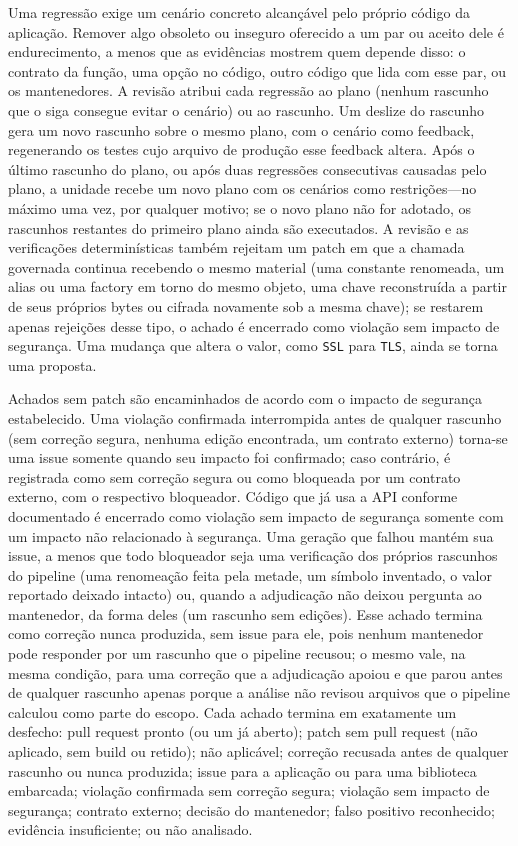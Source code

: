\documentclass[conference]{IEEEtran}
\begin{document}
Uma regressão exige um cenário concreto alcançável pelo próprio código da
aplicação. Remover algo obsoleto ou inseguro oferecido a um par ou aceito dele
é endurecimento, a menos que as evidências mostrem quem depende disso: o
contrato da função, uma opção no código, outro código que lida com esse par, ou
os mantenedores. A revisão atribui cada regressão ao plano (nenhum rascunho que
o siga consegue evitar o cenário) ou ao rascunho. Um deslize do rascunho gera
um novo rascunho sobre o mesmo plano, com o cenário como feedback, regenerando
os testes cujo arquivo de produção esse feedback altera. Após o último rascunho
do plano, ou após duas regressões consecutivas causadas pelo plano, a unidade
recebe um novo plano com os cenários como restrições---no máximo uma vez, por
qualquer motivo; se o novo plano não for adotado, os rascunhos restantes do
primeiro plano ainda são executados. A revisão e as verificações
determinísticas também rejeitam um patch em que a chamada governada continua
recebendo o mesmo material (uma constante
renomeada, um alias ou uma factory em torno do mesmo objeto, uma chave
reconstruída a partir de seus próprios bytes ou cifrada novamente sob a mesma
chave); se restarem apenas rejeições desse tipo, o achado é encerrado como
violação sem impacto de segurança. Uma mudança que altera o valor, como
\texttt{SSL} para \texttt{TLS}, ainda se torna uma proposta.

Achados sem patch são encaminhados de acordo com o impacto de segurança
estabelecido. Uma violação confirmada interrompida antes de qualquer rascunho
(sem correção segura, nenhuma edição encontrada, um contrato externo) torna-se
uma issue somente quando seu impacto foi confirmado; caso contrário, é
registrada como sem correção segura ou como bloqueada por um contrato externo,
com o respectivo bloqueador. Código que já usa a API conforme documentado é
encerrado como violação sem impacto de segurança somente com um impacto não
relacionado à segurança. Uma geração que falhou mantém sua issue, a menos que
todo bloqueador seja uma verificação dos próprios rascunhos do pipeline (uma
renomeação feita pela metade, um símbolo inventado, o valor reportado deixado
intacto) ou, quando a adjudicação não deixou pergunta ao mantenedor, da forma
deles (um rascunho sem edições). Esse achado termina como correção nunca
produzida, sem issue para ele, pois nenhum mantenedor pode responder por um
rascunho que o pipeline recusou; o mesmo vale, na mesma condição, para uma
correção que a adjudicação apoiou e que parou antes de qualquer rascunho apenas
porque a análise não revisou arquivos que o pipeline calculou como parte do
escopo. Cada achado
termina em exatamente um desfecho: pull request pronto (ou um já aberto); patch
sem pull request (não aplicado, sem build ou retido); não aplicável; correção
recusada antes de qualquer rascunho ou nunca produzida; issue para a aplicação
ou para uma biblioteca embarcada; violação confirmada sem correção segura;
violação sem impacto de segurança; contrato externo; decisão do mantenedor;
falso positivo reconhecido; evidência insuficiente; ou não analisado.
\end{document}
